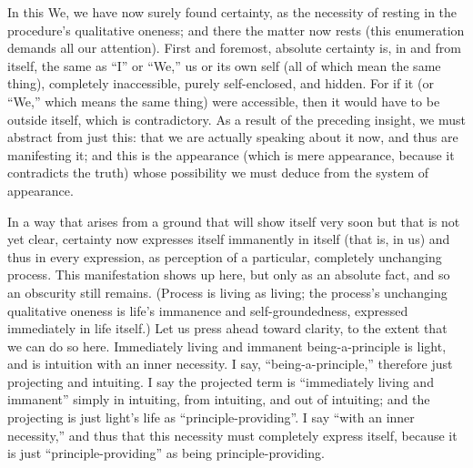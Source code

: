 In this We, we have now surely found certainty,
as the necessity of resting
in the procedure's qualitative oneness;
and there the matter now rests
(this enumeration demands all our attention).
First and foremost, absolute certainty is,
in and from itself,
the same as “I” or “We,”
us or its own self
(all of which mean the same thing),
completely inaccessible,
purely self-enclosed,
and hidden.
For if it
(or “We,” which means the same thing)
were accessible,
then it would have to be outside itself,
which is contradictory.
As a result of the preceding insight,
we must abstract from just this:
that we are actually speaking about it now,
and thus are manifesting it;
and this is the appearance
(which is mere appearance,
because it contradicts the truth)
whose possibility we must deduce
from the system of appearance.

In a way that arises from a ground
that will show itself very soon but
that is not yet clear,
certainty now expresses itself immanently in itself
(that is, in us)
and thus in every expression,
as perception of a particular,
completely unchanging process.
This manifestation shows up here, but only as
an absolute fact, and so an obscurity still remains.
(Process is living as living;
the process's unchanging qualitative oneness is
life's immanence and self-groundedness,
expressed immediately in life itself.)
Let us press ahead toward clarity,
to the extent that we can do so here.
Immediately living and immanent being-a-principle is light,
and is intuition with an inner necessity.
I say, “being-a-principle,”
therefore just projecting and intuiting.
I say the projected term is “immediately living and immanent”
simply in intuiting, from intuiting, and out of intuiting;
and the projecting is just light's life as “principle-providing”.
I say “with an inner necessity,”
and thus that this necessity must
completely express itself,
because it is just “principle-providing”
as being principle-providing.

